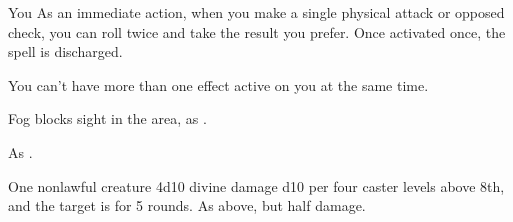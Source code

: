 \begin{spellheader}
\end{spellheader}
\begin{spelleffects}
    \begin{spelltarget}{You}
        \spelleffect As an immediate action, when you make a single physical attack or opposed check, you can roll twice and take the result you prefer. Once activated once, the spell is discharged.
    \end{spelltarget}
\end{spelleffects}
\begin{spellfooter}
    \spellnotes You can't have more than one  effect active on you at the same time.
\end{spellfooter}

\begin{comment}
\subsubsection{O-P}
\end{comment}

\begin{spellheader}
    \spelldur{\durshort}
\end{spellheader}
\begin{spelleffects}
    \spelleffect Fog blocks sight in the area, as .
\end{spelleffects}
\begin{spellfooter}
    \spellnotes As .
\end{spellfooter}

\begin{spellheader}
    \spellrng{\rngmed}
\end{spellheader}
\begin{spelleffects}
    \begin{spelltarget}{One nonlawful creature}
        \spellsuccess 4d10 divine damage \add d10 per four caster levels above 8th, and the target is \bewildered for 5 rounds.
        \spellfailure As above, but half damage.
    \end{spelltarget}
\end{spelleffects}
\begin{spellfooter}
    
\end{spellfooter}

